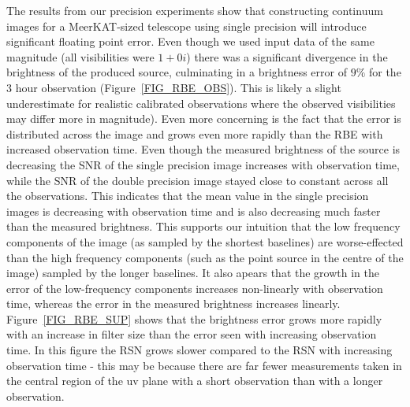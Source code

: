 The results from our precision experiments show that constructing continuum images for a MeerKAT-sized telescope using single precision will introduce significant floating point error. Even though we used input data of the same magnitude (all
visibilities were $1+0i$) there was a significant divergence in the brightness of the produced source, culminating in a brightness error of $9\%$ for the 3 hour observation (Figure~\ref{FIG_RBE_OBS}). This is likely a slight underestimate 
for realistic calibrated observations where the observed visibilities may differ more in magnitude). Even more concerning is the fact that the error is distributed across the image and grows even more rapidly than the RBE with 
increased observation time. Even though the measured brightness of the source is decreasing the SNR of the single precision image increases with observation time, while the SNR of the double precision image stayed close to 
constant across all the observations. This indicates that the mean value in the single precision images is decreasing with observation time and is also decreasing much faster than the measured brightness. This supports our 
intuition that the low frequency components of the image (as sampled by the shortest baselines) are worse-effected than the high frequency components (such as the point source in the centre of the image) sampled by the longer baselines. It 
also apears that the growth in the error of the low-frequency components increases non-linearly with observation time, whereas the error in the measured brightness increases linearly. Figure~\ref{FIG_RBE_SUP} shows that the brightness error 
grows more rapidly with an increase in filter size than the error seen with increasing observation time. In this figure the RSN grows slower compared to the RSN with increasing observation time - this may be because there are far 
fewer measurements taken in the central region of the uv plane with a short observation than with a longer observation. 

